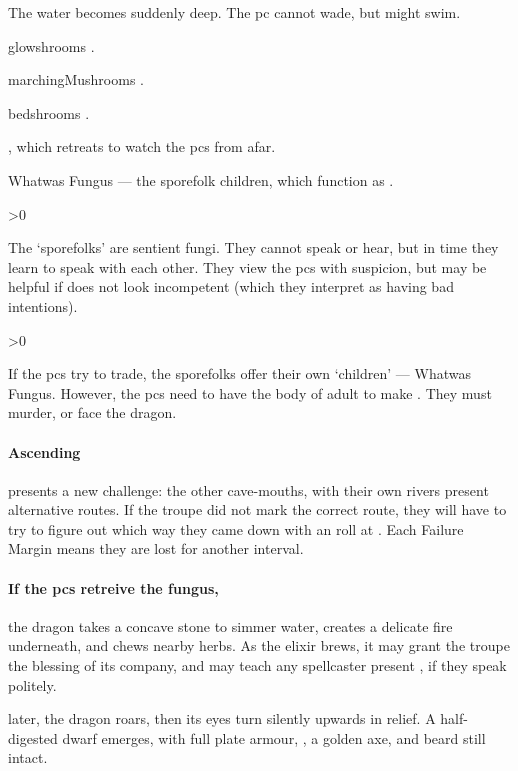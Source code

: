 \documentclass[10pt,twoside]{book}
\begin{document}
{
  \footnotesize
  \begin{dlist}
    \item
    The water becomes suddenly deep.
    The \gls{pc} cannot wade, but might swim.
    \item
    \Glspl{glowshroom} .
    \item
    \Glspl{marchingMushroom} .
    \item
    \Glspl{bedshroom} .
    \item
    , which retreats to watch the \glspl{pc} from afar.
    \item
    Whatwas Fungus --- the \gls{sporefolk} children, which function as .
  \end{dlist}
}

\randomize

\sporeFolk

\ifnum\value{Charisma}>0
  {\small{}}
\fi

\noindent
The `\glspl{sporefolk}' are sentient fungi.%
They cannot speak or hear, but in time they learn to speak with each other.
They view the \glspl{pc} with suspicion, but may be helpful if  does not look incompetent (which they interpret as having bad intentions).

\sporeFolk

\ifnum\value{Charisma}>0
  {\small{}}
\fi

\wotWosFungus

\noindent
If the \glspl{pc} try to trade, the \glspl{sporefolk} offer their own `children' --- Whatwas Fungus.
However, the \glspl{pc} need to have the body of  adult to make .
They must murder, or face the dragon.

\showTalisman


\paragraph{Ascending}
presents a new challenge: the other cave-mouths, with their own rivers present alternative routes.
If the troupe did not mark the correct route, they will have to try to figure out which way they came down with an  roll at \tn[10].
Each Failure Margin means they are lost for another \gls{interval}.

\paragraph{If the \glspl{pc} retreive the fungus,}
the dragon takes a concave stone to simmer water, creates a delicate fire underneath, and chews nearby herbs.
As the \gls{elixir} brews, it may grant the troupe the blessing of its company, and may teach any spellcaster present , if they speak politely.

 later, the dragon roars, then its eyes turn silently upwards in relief.
A half-digested dwarf emerges, with full plate armour, \lootBig, a golden axe, and beard still intact.
\end{document}
